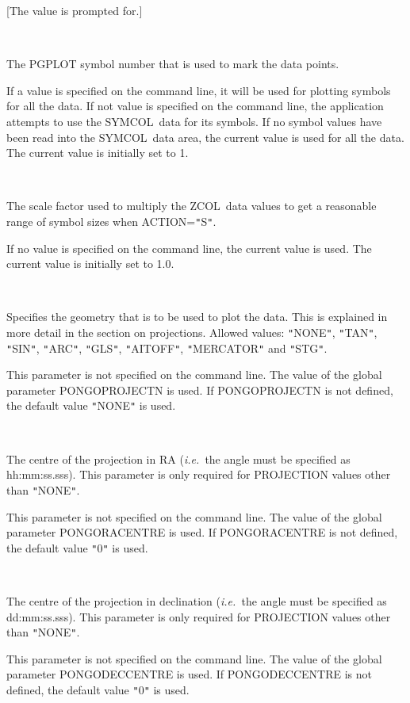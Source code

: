\documentclass[twoside,11pt]{article}
\renewcommand{\_}{\texttt{\symbol{95}}}
\newcommand{\ie}{{\em i.e.\ }}
\newcommand{\zcol}{{\sf ZCOL}}
\newcommand{\symcol}{{\sf SYMCOL}}
\newcommand{\sstsubsection}[1]{ \item[{#1}] \mbox{} \\}
\newcommand{\sstsubsection}[1]{\item[{#1}]}
\begin{document}
{{{{         }
         [The value is prompted for.]
      }
      \sstsubsection{
         SYMBOL = \_INTEGER (Read and Write)
      }{
         The PGPLOT symbol number that is used to mark the data points.

         If a value is specified on the command line, it will be used
         for plotting symbols for all the data. If not value is
         specified on the command line, the application attempts to use
         the \symcol\ data for its symbols. If no symbol values have been
         read into the \symcol\ data area, the current value is used for
         all the data. The current value is initially set to 1.
      }
      \sstsubsection{
         SCALE = \_REAL (Read and Write)
      }{
         The scale factor used to multiply the \zcol\ data values to get
         a reasonable range of symbol sizes when ACTION={\tt "}S{\tt "}.

         If no value is specified on the command line, the current
         value is used. The current value is initially set to 1.0.
      }
      \sstsubsection{
         PROJECTION = \_CHAR (Read)
      }{
         Specifies the geometry that is to be used to plot the data.
         This is explained in more detail in the section on
         projections.  Allowed values: {\tt "}NONE{\tt "}, {\tt "}TAN{\tt "}, {\tt "}SIN{\tt "}, {\tt "}ARC{\tt "},
         {\tt "}GLS{\tt "}, {\tt "}AITOFF{\tt "}, {\tt "}MERCATOR{\tt "} and {\tt "}STG{\tt "}.

         This parameter is not specified on the command line. The value
         of the global parameter PONGO\_PROJECTN is used. If
         PONGO\_PROJECTN is not defined, the default value {\tt "}NONE{\tt "} is
         used.
      }
      \sstsubsection{
         RACENTRE = \_CHAR (Read)
      }{
         The centre of the projection in RA (\ie the angle must be
         specified as hh:mm:ss.sss). This parameter is only required for
         PROJECTION values other than {\tt "}NONE{\tt "}.

         This parameter is not specified on the command line. The value
         of the global parameter PONGO\_RACENTRE is used. If
         PONGO\_RACENTRE is not defined, the default value {\tt "}0{\tt "} is used.
      }
      \sstsubsection{
         DECCENTRE = \_CHAR (Read)
      }{
         The centre of the projection in declination (\ie the angle
         must be specified as dd:mm:ss.sss). This parameter is only
         required for PROJECTION values other than {\tt "}NONE{\tt "}.

         This parameter is not specified on the command line. The value
         of the global parameter PONGO\_DECCENTRE is used. If
         PONGO\_DECCENTRE is not defined, the default value {\tt "}0{\tt "} is used.
      }
   }
}
\end{document}
